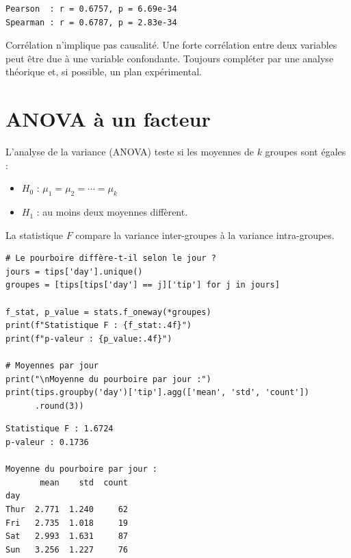 \begin{codeoutput}
\begin{verbatim}
Pearson  : r = 0.6757, p = 6.69e-34
Spearman : r = 0.6787, p = 2.83e-34
\end{verbatim}
\end{codeoutput}

\begin{attention}
Corr\'elation n'implique pas causalit\'e. Une forte corr\'elation entre deux variables peut \^etre due \`a une variable confondante. Toujours compl\'eter par une analyse th\'eorique et, si possible, un plan exp\'erimental.
\end{attention}

\section{ANOVA \`a un facteur}

\begin{definition}[ANOVA]
L'analyse de la variance (ANOVA) teste si les moyennes de $k$ groupes sont \'egales :
\begin{itemize}
    \item $H_0$ : $\mu_1 = \mu_2 = \cdots = \mu_k$
    \item $H_1$ : au moins deux moyennes diff\`erent.
\end{itemize}
La statistique $F$ compare la variance inter-groupes \`a la variance intra-groupes.
\end{definition}

\begin{codeblock}[title=\textbf{Python}]
\begin{verbatim}
# Le pourboire diffère-t-il selon le jour ?
jours = tips['day'].unique()
groupes = [tips[tips['day'] == j]['tip'] for j in jours]

f_stat, p_value = stats.f_oneway(*groupes)
print(f"Statistique F : {f_stat:.4f}")
print(f"p-valeur : {p_value:.4f}")

# Moyennes par jour
print("\nMoyenne du pourboire par jour :")
print(tips.groupby('day')['tip'].agg(['mean', 'std', 'count'])
      .round(3))
\end{verbatim}
\end{codeblock}

\begin{codeoutput}
\begin{verbatim}
Statistique F : 1.6724
p-valeur : 0.1736

Moyenne du pourboire par jour :
       mean    std  count
day
Thur  2.771  1.240     62
Fri   2.735  1.018     19
Sat   2.993  1.631     87
Sun   3.256  1.227     76

\end{verbatim}
\end{codeoutput}

